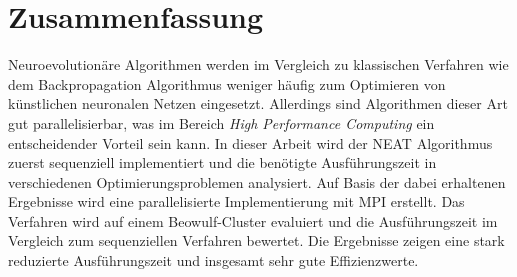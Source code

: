 \section*{Zusammenfassung}
Neuroevolutionäre Algorithmen werden im Vergleich zu klassischen Verfahren wie dem Backpropagation Algorithmus weniger häufig zum Optimieren von künstlichen neuronalen Netzen eingesetzt. Allerdings sind Algorithmen dieser Art gut parallelisierbar, was im Bereich \emph{High Performance Computing} ein entscheidender Vorteil sein kann. In dieser Arbeit wird der \acs*{NEAT} Algorithmus zuerst sequenziell implementiert und die benötigte Ausführungszeit in verschiedenen Optimierungsproblemen analysiert. Auf Basis der dabei erhaltenen Ergebnisse wird eine parallelisierte Implementierung mit \acs*{MPI} erstellt. Das Verfahren wird auf einem Beowulf-Cluster evaluiert und die Ausführungszeit im Vergleich zum sequenziellen Verfahren bewertet. Die Ergebnisse zeigen eine stark reduzierte Ausführungszeit und insgesamt sehr gute Effizienzwerte.

